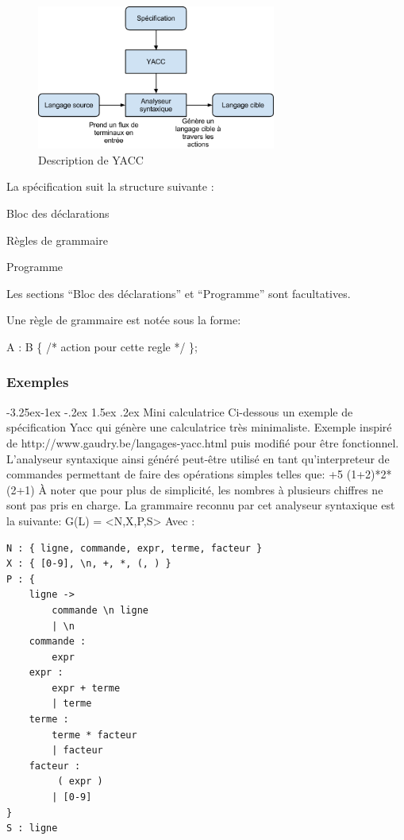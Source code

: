 \documentclass{article}
\makeatletter
\newcounter {subsubsubsection}[subsubsection]
\newcommand\subsubsubsection{\@startsection{subsubsubsection}{4}{\z@}%
                                     {-3.25ex\@plus -1ex \@minus -.2ex}%
                                     {1.5ex \@plus .2ex}%
                                     {\normalfont\normalsize\bfseries}}
\makeatother
\begin{document}
\begin{figure}[h]
	\centering
		\includegraphics[width=0.70\textwidth]{yaccDiagramme.png}
	\caption{Description de YACC}
	\label{fig:yaccDiagramme}
\end{figure}\FloatBarrier

La spécification suit la structure suivante :

Bloc des déclarations


Règles de grammaire


Programme

Les sections “Bloc des déclarations” et “Programme” sont facultatives.

Une règle de grammaire est notée sous la forme:

A : B \{ /* action pour cette regle */ \};

\subsubsection{ Exemples }

\subsubsubsection{ Mini calculatrice }
Ci-dessous un exemple de spécification Yacc qui génère une calculatrice très minimaliste. Exemple inspiré de http://www.gaudry.be/langages-yacc.html puis modifié pour être fonctionnel.
L'analyseur syntaxique ainsi généré peut-être utilisé en tant qu'interpreteur de commandes permettant de faire des opérations simples telles que: +5\newline
(1+2)*2*(2+1)\newline
À noter que pour plus de simplicité, les nombres à plusieurs chiffres ne sont pas pris en charge.
La grammaire reconnu par cet analyseur syntaxique est la suivante:
G(L) = <N,X,P,S>
Avec :
\begin{verbatim}
N : { ligne, commande, expr, terme, facteur }
X : { [0-9], \n, +, *, (, ) }
P : {
    ligne -> 		
        commande \n ligne
        | \n
    commande :	
        expr
    expr :		
        expr + terme
        | terme
    terme : 		
        terme * facteur
        | facteur
    facteur : 		
         ( expr )
        | [0-9]
}
S : ligne
\end{verbatim}
\end{document}
